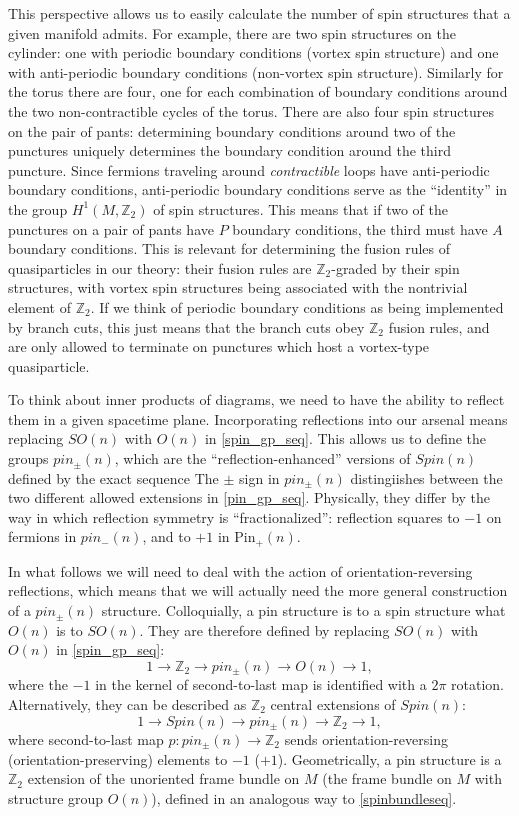 \documentclass[12pt,a4paper]{article}
\newcounter{arrow}
\newcommand{\ra}{\rightarrow}
\newcommand{\zt}{\mathbb{Z}_2}
\newcommand\be            {\begin{equation}}
\newcommand\ee            {\end{equation}}
\newcommand{\spin}{\text{Spin}}
\newcommand{\pin}{\text{Pin}}	%
\begin{document}
This perspective allows us to easily calculate the number of spin structures that a given manifold admits. 
For example, there are two spin structures on the cylinder: one with periodic boundary conditions (vortex 
spin structure) and one with anti-periodic boundary conditions (non-vortex spin structure). Similarly for the 
torus there are four, one for each combination of boundary conditions around the two non-contractible 
cycles of the torus. There are also four spin structures on the pair of pants: determining boundary 
conditions around two of the punctures uniquely determines the boundary condition around the third 
puncture. Since fermions traveling around {\it contractible} loops have anti-periodic boundary conditions, 
anti-periodic boundary conditions serve as the ``identity'' in the group $H^1(M,\zt)$ of spin structures. This 
means that if two of the punctures on a pair of pants have $P$ boundary conditions, the third must have 
$A$ boundary conditions. This is relevant for determining the fusion rules of quasiparticles in our theory: 
their fusion rules are $\zt$-graded by their spin structures, with vortex spin structures being associated 
with the nontrivial element of $\zt$. If we think of periodic boundary conditions as being implemented by 
branch cuts, this just means that the branch cuts obey $\zt$ fusion rules, and are only allowed to terminate 
on punctures which host a vortex-type quasiparticle. 


To think about inner products of diagrams, we need to have the ability to reflect them in a given spacetime plane. Incorporating reflections into our arsenal means replacing $SO(n)$ with $O(n)$ in \eqref{spin_gp_seq}. This allows us to define the groups $pin_\pm(n)$, which are the ``reflection-enhanced'' versions of $Spin(n)$ defined by the exact sequence 
 The $\pm$ sign in $pin_\pm(n)$ distingiishes between the two different allowed extensions in \eqref{pin_gp_seq}. Physically, they differ by the way in which reflection symmetry is ``fractionalized'': reflection squares to $-1$ on fermions in $pin_-(n)$, and to $+1$ in $\pin_+(n)$. 


In what follows we will need to deal with the action of orientation-reversing reflections, which means that we will actually need the more general construction of a $pin_\pm(n)$ structure. Colloquially, a pin structure is to a spin structure what $O(n)$ is to $SO(n)$. They are therefore defined by replacing $SO(n)$ with $O(n)$ in \eqref{spin_gp_seq}:
\be \label{pin_gp_seq} 1 \ra \zt \ra pin_\pm(n) \ra O(n) \ra 1,\ee
where the $-1$ in the kernel of second-to-last map is identified with a $2\pi$ rotation.
Alternatively, they can be described as $\zt$ central extensions of $Spin(n)$:
\be \label{pinseq} 1\ra Spin(n) \ra pin_\pm(n) \ra \zt \ra 1,\ee 
where second-to-last map $p : pin_\pm(n) \ra \zt$ sends orientation-reversing (orientation-preserving) elements to $-1$ ($+1$). Geometrically, a pin structure is a $\zt$ extension of the unoriented frame bundle on $M$ (the frame bundle on $M$ with structure group $O(n)$), defined in an analogous way to \eqref{spinbundleseq}.
\end{document}
